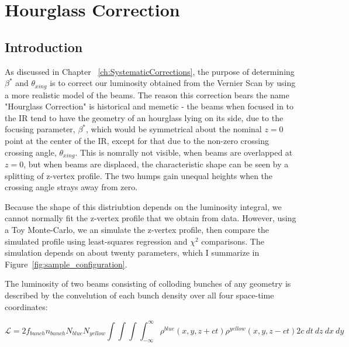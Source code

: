 

\chapter{Hourglass Correction}
\label{ch:HourglassCorrection}

\section{Introduction}
As discussed in Chapter ~\ref{ch:SystematicCorrections}, the purpose of
determining $\beta^{*}$ and $\theta_{xing}$ is to correct our luminosity
obtained from the Vernier Scan by using a more realistic model of the beams.
The reason this correction bears the name "Hourglass Correction" is historical
and memetic - the beams when focused in to the IR tend to have the geometry of
an hourglass lying on its side, due to the focusing parameter, $\beta^{*}$,
which would be symmetrical about the nominal $z = 0$ point at the center of the
IR, except for that due to the non-zero crossing crossing angle,
$\theta_{xing}$. This is nomrally not visible, when beams are overlapped at $z =
0$, but when beams are displaced, the characteristic shape can be seen by a
splitting of z-vertex profile. The two humps gain unequal heights when the
crossing angle strays away from zero.

Because the shape of this distriubtion depends on the luminosity integral, we
cannot normally fit the z-vertex profile that we obtain from data. However,
using a Toy Monte-Carlo, we an simulate the z-vertex profile, then compare the
simulated profile using least-squares regression and $\chi^{2}$ comparisons. The
simulation depends on about twenty parameters, which I summarize in
Figure~\ref{fig:sample_configuration}. 

The luminosity of two beams consisting of colloding bunches of any geometry is
described by the convelution of each bunch density over all four space-time
coordinates:

\begin{equation}
  \label{eq:generalluminosity}
  \mathcal{L} = {2 f_{bunch} n_{bunch} N_{blue} N_{yellow} \int \int \int
    \int_{-\infty}^{\infty }\rho^{blue}(x,y,z+ct)\rho^{yellow}(x,y,z-ct)2c\
  dt\ dz\ dx\ dy } 
\end{equation}

